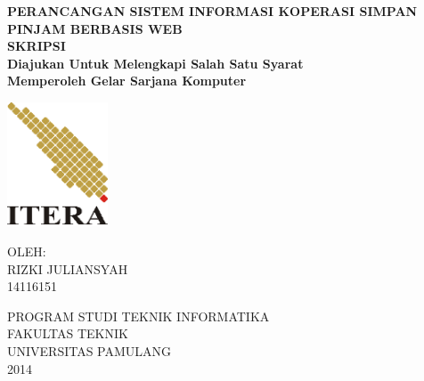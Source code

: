 \begin{center}
	\onehalfspacing
	\large \bfseries PERANCANGAN SISTEM INFORMASI KOPERASI SIMPAN PINJAM BERBASIS WEB \\
	\vspace{1cm}
	 \large SKRIPSI \\
	 \normalsize Diajukan Untuk Melengkapi Salah Satu Syarat \\ Memperoleh Gelar Sarjana Komputer
	
	\vspace{2cm}
	
	\includegraphics[width=3cm]{images/logo-itera.png}
	
	\vspace{1cm}
	\large OLEH: \\
	RIZKI JULIANSYAH \\
	14116151
	
	\vspace{3cm}
	
	\normalsize PROGRAM STUDI TEKNIK INFORMATIKA \\
	\large FAKULTAS TEKNIK \\
	UNIVERSITAS PAMULANG \\
	2014
	

	
\end{center}

\newpage